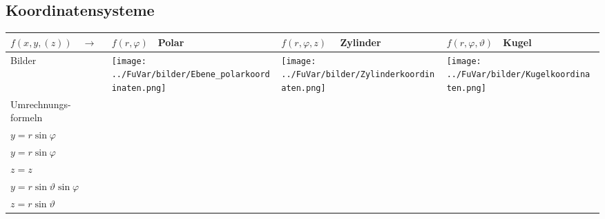 \subsection{Koordinatensysteme}
\begin{tabular}{|p{2.5cm}||p{3cm}|p{4.2cm}|p{7.5cm}|}
	\hline
	$f(x,y,(z))\quad\rightarrow$ &
	\begin{minipage}{2.4cm}
    	\vspace{0.1cm}
		$f(r,\varphi)\quad$\textbf{Polar} 
    	\vspace{0.1cm}    	
    \end{minipage}& 
	$f(r,\varphi,z)\quad$ \textbf{Zylinder} &
	$f(r,\varphi,\vartheta)\quad$\textbf{Kugel}\\
	\hline
	\hline
	Bilder &
	\begin{minipage}{3cm}
    	\texttt{[image: ../FuVar/bilder/Ebene\_polarkoordinaten.png]}
    \end{minipage}&
	\begin{minipage}{3cm}
    	\texttt{[image: ../FuVar/bilder/Zylinderkoordinaten.png]}
    \end{minipage}&
	\begin{minipage}{3cm}
    	\texttt{[image: ../FuVar/bilder/Kugelkoordinaten.png]}
    \end{minipage}\\
	\hline
	Umrechnungs- formeln &
	\begin{minipage}{3cm}
    \vspace{0.1cm}
		$x=r\cos\varphi$\\
		$y=r\sin\varphi$    
    \vspace{0.1cm}
    \end{minipage}&	
	\begin{minipage}{4.2cm}
    \vspace{0.1cm}
    	$x=r\cos\varphi$\\
    	$y=r\sin\varphi$\\
    	$z=z$
    \vspace{0.1cm}
    \end{minipage}&	
	\begin{minipage}{7.5cm}
    \vspace{0.1cm}
    	$x=r\sin\vartheta\cos\varphi$\\
    	$y=r\sin\vartheta\sin\varphi$\\
    	$z=r\sin\vartheta$
    \vspace{0.1cm}
    \end{minipage}\\

\end{tabular}
